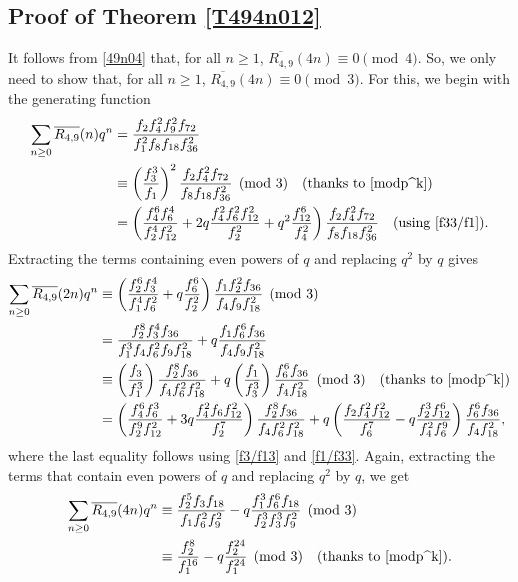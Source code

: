 \documentclass{amsart}
\theoremstyle{definition}
\begin{document}
\subsection*{Proof of Theorem \ref{T494n012}} It follows from \eqref{49n04} that, for all $n\geq 1$, $\overline{R_{4,9}}(4n)\equiv0\pmod{4}$. So, we only need to show that, for all $n\geq 1$,  $\overline{R_{4,9}}(4n)\equiv0\pmod{3}$. For this, we begin with the generating function
\begin{align}
   \label{49G} \sum_{n\geq 0}\overline{R_{4,9}}(n)q^n&=\frac{f_2f_4^2f_9^2f_{72}}{f_1^2f_{8}f_{18}f_{36}^2}\\
    \notag&\equiv \left(\frac{f_3^3}{f_1}\right)^2\frac{f_2f_4^2f_{72}}{f_8f_{18}f_{36}^2}\pmod{3} \quad \text{(thanks to \eqref{modp^k})}\\
    \notag&= \left(\frac{f_4^6f_6^4}{f_2^4f_{12}^2}+2q\frac{f_4^2f_6^2f_{12}^2}{f_2^2}+q^2\frac{f_{12}^6}{f_4^2}\right)\frac{f_2f_4^2f_{72}}{f_8f_{18}f_{36}^2} \quad \text{(using \eqref{f33/f1})}.
\end{align}
Extracting the terms containing even powers of $q$ and replacing $q^2$ by $q$ gives
\begin{align*}
    \sum_{n\geq0} \overline{R_{4,9}}(2n)q^{n}&\equiv\left(\frac{f_2^6f_3^4}{f_1^4f_{6}^2}+q\frac{f_{6}^6}{f_2^2}\right)\frac{f_1f_2^2f_{36}}{f_4f_9f_{18}^2} \pmod{3}\\
    &=\frac{f_2^8f_3^4f_{36}}{f_1^3f_4f_6^2f_9f_{18}^2} + q\frac{f_1f_6^6f_{36}}{f_4f_9f_{18}^2}\\
    &\equiv\left(\frac{f_3}{f_1^3}\right)\frac{f_2^8f_{36}}{f_4f_6^2f_{18}^2}+q\left(\frac{f_1}{f_3^3}\right)\frac{f_6^6f_{36}}{f_4f_{18}^2} \pmod{3} \quad \text{(thanks to \eqref{modp^k})}\\
    &= \left(\frac{f_4^6f_6^3}{f_2^9f_{12}^2}+3q\frac{f_4^2f_6f_{12}^2}{f_2^7}\right)\frac{f_2^8f_{36}}{f_4f_6^2f_{18}^2}+q\left(\frac{f_2f_4^2f_{12}^2}{f_6^7}-q\frac{f_2^3f_{12}^6}{f_4^2f_6^9}\right) \frac{f_6^6f_{36}}{f_4f_{18}^2},
\end{align*}
where the last equality follows using \eqref{f3/f13} and \eqref{f1/f33}. Again, extracting the terms that contain even powers of $q$ and replacing $q^2$ by $q$, we get 
\begin{align*}
     \sum_{n\geq0} \overline{R_{4,9}}(4n)q^{n}&\equiv\frac{f_2^5f_3f_{18}}{f_1f_6^2f_9^2}-q\frac{f_1^3f_6^6f_{18}}{f_2^3f_3^3f_9^2} \pmod{3}\\
     &\equiv \frac{f_2^8}{f_1^{16}}-q\frac{f_2^{24}}{f_1^{24}}\pmod{3}   \quad \text{(thanks to \eqref{modp^k})}.
\end{align*}
\end{document}
